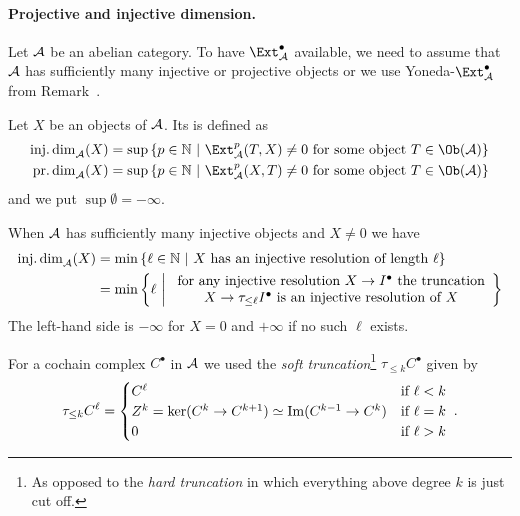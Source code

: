 \documentclass[a4paper,parskip=half,numbers=enddot, DIV=12]{scrreprt}
\begin{document}
\paragraph{Projective and injective dimension.} Let $\mathcal{A}$ be an abelian category. To have $\Ext_\Aa^\bullet$ available, we need to assume that $\mathcal{A}$ has sufficiently many injective or projective objects or we use Yoneda-$\Ext_\Aa^\bullet$ from Remark~.
\begin{defi}
	Let $X$ be an objects of $\mathcal{A}$. Its  is defined as
	\begin{align*}
		\idim_\Aa(X)&=\sup\left\{p\in\IN\st \Ext_\Aa^p(T,X)\neq 0\text{ for some object }T\in\Ob(\Aa)\right\}\\
		\pdim_\Aa(X)&=\sup\left\{p\in\IN\st \Ext_\Aa^p(X,T)\neq 0\text{ for some object }T\in\Ob(\Aa)\right\}
	\end{align*}
	and we put $\sup\emptyset =-\infty$.
\end{defi}
\begin{fact}
	When $\mathcal{A}$ has sufficiently many injective objects and $X\neq 0$ we have
	\begin{align*}
		\idim_\Aa(X)&=\min\left\{\ell\in\IN\st X\text{ has an injective resolution of length }\ell\right\}\\
	&=	\min\left\{\ell\st\begin{array}{c}
	\text{for any injective resolution }X\morphism I^\bullet\text{ the truncation}\\
	X\morphism\tau_{\leq\ell}I^\bullet\text{ is an injective resolution of }X
	\end{array}
	\right\}
	\end{align*}
	The left-hand side is $-\infty$ for $X=0$ and $+\infty$ if no such $\ell$ exists. 
\end{fact}
For a cochain complex $C^\bullet$ in $\mathcal{A}$ we used the \emph{soft truncation}\footnote{As opposed to the \emph{hard truncation} in which everything above degree $k$ is just cut off.} $\tau_{\leq k}C^\bullet$ given by 
\begin{align*}
	\tau_{\leq k}C^\ell=\begin{cases}
	C^\ell & \text{if }\ell<k\\
	Z^k=\ker(C^k\morphism C^{k+1})\simeq \Im(C^{k-1}\morphism C^k) & \text{if }\ell=k\\
	0 & \text{if }\ell>k
	\end{cases}\;.
\end{align*}
\end{document}
